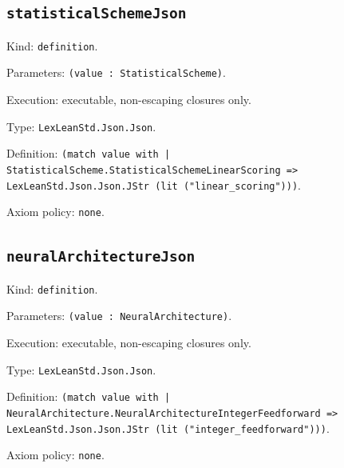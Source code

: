 \documentclass[11pt]{article}
\begin{document}
\subsection*{\texttt{statisticalSchemeJson}}
\noindent Kind: \texttt{definition}.\par
\noindent Parameters: \texttt{(value : StatisticalScheme)}.\par
\noindent Execution: executable, non-escaping closures only.\par
\noindent Type: \texttt{LexLeanStd.Json.Json}.\par
\noindent Definition: \texttt{(match value with | StatisticalScheme.StatisticalSchemeLinearScoring => LexLeanStd.Json.Json.JStr (lit ("linear\_scoring")))}.\par
\noindent Axiom policy: \texttt{none}.\par
\subsection*{\texttt{neuralArchitectureJson}}
\noindent Kind: \texttt{definition}.\par
\noindent Parameters: \texttt{(value : NeuralArchitecture)}.\par
\noindent Execution: executable, non-escaping closures only.\par
\noindent Type: \texttt{LexLeanStd.Json.Json}.\par
\noindent Definition: \texttt{(match value with | NeuralArchitecture.NeuralArchitectureIntegerFeedforward => LexLeanStd.Json.Json.JStr (lit ("integer\_feedforward")))}.\par
\noindent Axiom policy: \texttt{none}.\par
\end{document}
